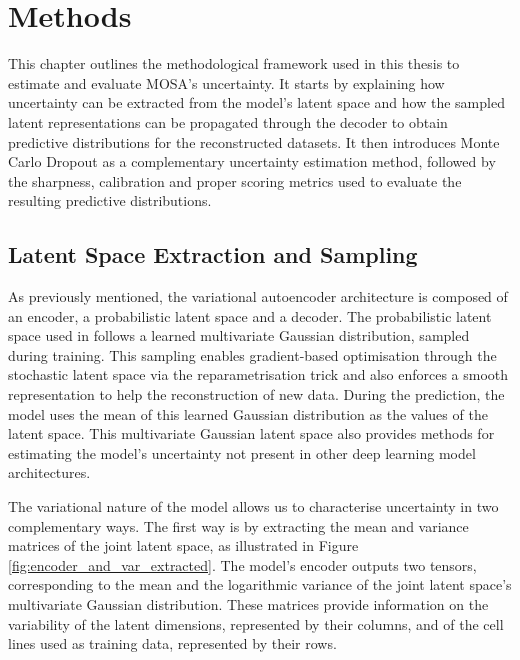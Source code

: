 
\chapter{Methods}
\label{chapter:Uncertainty_Estimation}

This chapter outlines the methodological framework used in this thesis to estimate and evaluate MOSA's uncertainty. It starts by explaining how uncertainty can be extracted from the model's latent space and how the sampled latent representations can be propagated through the decoder to obtain predictive distributions for the reconstructed datasets. It then introduces Monte Carlo Dropout as a complementary uncertainty estimation method, followed by the sharpness, calibration and proper scoring metrics used to evaluate the resulting predictive distributions.
 
\section{Latent Space Extraction and Sampling} \label{Latent_Space_Sampling}

As previously mentioned, the variational autoencoder architecture is composed of an encoder, a probabilistic latent space and a decoder. The probabilistic latent space used in \citep{Cai2024} follows a learned multivariate Gaussian distribution, sampled during training. This sampling enables gradient-based optimisation through the stochastic latent space via the reparametrisation trick and also  enforces a smooth representation to help the reconstruction of new data. During the prediction, the model uses the mean of this learned Gaussian distribution as the values of the latent space. This multivariate Gaussian latent space also provides methods for estimating the model's uncertainty not present in other deep learning model architectures.

The variational nature of the model allows us to characterise uncertainty in two complementary ways. The first way is by extracting the mean and variance matrices of the joint latent space, as illustrated in Figure \ref{fig:encoder_and_var_extracted}. The model's encoder outputs two tensors, corresponding to the mean and the logarithmic variance of the joint latent space's multivariate Gaussian distribution. These matrices provide information on the variability of the latent dimensions, represented by their columns, and of the cell lines used as training data, represented by their rows.

